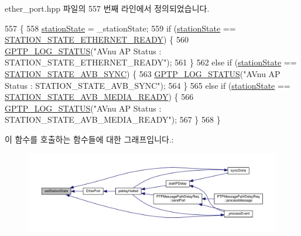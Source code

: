 ether\+\_\+port.\+hpp 파일의 557 번째 라인에서 정의되었습니다.


\begin{DoxyCode}
557                                                        \{
558         \hyperlink{class_ether_port_a91c1bea6a5b70f19ba852e5feb706324}{stationState} = \_stationState;
559         \textcolor{keywordflow}{if} (\hyperlink{class_ether_port_a91c1bea6a5b70f19ba852e5feb706324}{stationState} == \hyperlink{avbap__message_8hpp_a0ea424c21354a92be352893d8feeea22a4d094d181a904b8b12f95bdeef3a09ee}{STATION\_STATE\_ETHERNET\_READY}) \{
560             \hyperlink{gptp__log_8hpp_a9bcf107d6f77d335b92bbc4825ea85a3}{GPTP\_LOG\_STATUS}(\textcolor{stringliteral}{"AVnu AP Status : STATION\_STATE\_ETHERNET\_READY"});
561         \}
562         \textcolor{keywordflow}{else} \textcolor{keywordflow}{if} (\hyperlink{class_ether_port_a91c1bea6a5b70f19ba852e5feb706324}{stationState} == \hyperlink{avbap__message_8hpp_a0ea424c21354a92be352893d8feeea22aec110543ac8ee8ecd4b1f51e6184eb4c}{STATION\_STATE\_AVB\_SYNC}) \{
563             \hyperlink{gptp__log_8hpp_a9bcf107d6f77d335b92bbc4825ea85a3}{GPTP\_LOG\_STATUS}(\textcolor{stringliteral}{"AVnu AP Status : STATION\_STATE\_AVB\_SYNC"});
564         \}
565         \textcolor{keywordflow}{else} \textcolor{keywordflow}{if} (\hyperlink{class_ether_port_a91c1bea6a5b70f19ba852e5feb706324}{stationState} == \hyperlink{avbap__message_8hpp_a0ea424c21354a92be352893d8feeea22ac411a4c30d2a335d8c0eb33060a20576}{STATION\_STATE\_AVB\_MEDIA\_READY}) \{
566             \hyperlink{gptp__log_8hpp_a9bcf107d6f77d335b92bbc4825ea85a3}{GPTP\_LOG\_STATUS}(\textcolor{stringliteral}{"AVnu AP Status : STATION\_STATE\_AVB\_MEDIA\_READY"});
567         \}
568     \}
\end{DoxyCode}


이 함수를 호출하는 함수들에 대한 그래프입니다.\+:
\nopagebreak
\begin{figure}[H]
\begin{center}
\leavevmode
\includegraphics[width=350pt]{class_ether_port_ae2e3886b6c2390abad4892141f3114e2_icgraph}
\end{center}
\end{figure}



